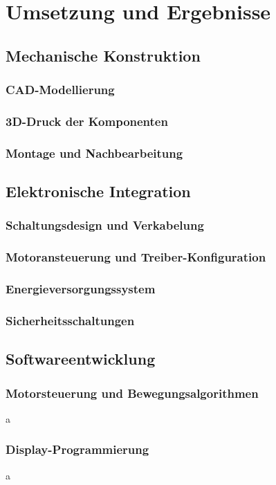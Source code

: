 \chapter{Umsetzung und Ergebnisse}
\label{cha:umsetzung}

\section{Mechanische Konstruktion}
\subsection{CAD-Modellierung}
\subsection{3D-Druck der Komponenten}
\subsection{Montage und Nachbearbeitung}

\section{Elektronische Integration}
\subsection{Schaltungsdesign und Verkabelung}
\subsection{Motoransteuerung und Treiber-Konfiguration}
\subsection{Energieversorgungssystem}
\subsection{Sicherheitsschaltungen}

\section{Softwareentwicklung}
\subsection{Motorsteuerung und Bewegungsalgorithmen}
a
\subsection{Display-Programmierung}
a
